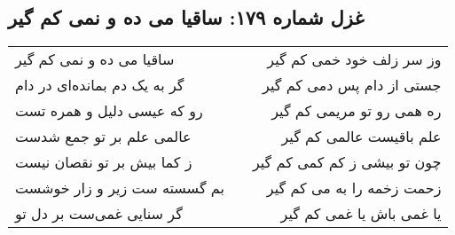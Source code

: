 \begin{center}
\section*{غزل شماره ۱۷۹: ساقیا می ده و نمی کم گیر}
\label{sec:179}
\begin{longtable}{l p{0.5cm} r}
ساقیا می ده و نمی کم گیر
&&
وز سر زلف خود خمی کم گیر
\\
گر به یک دم بمانده‌ای در دام
&&
جستی از دام پس دمی کم گیر
\\
رو که عیسی دلیل و همره تست
&&
ره همی رو تو مریمی کم گیر
\\
عالمی علم بر تو جمع شدست
&&
علم باقیست عالمی کم گیر
\\
ز کما بیش بر تو نقصان نیست
&&
چون تو بیشی ز کم کمی کم گیر
\\
بم گسسته ست زیر و زار خوشست
&&
زحمت زخمه را به می کم گیر
\\
گر سنایی غمی‌ست بر دل تو
&&
یا غمی باش یا غمی کم گیر
\\
\end{longtable}
\end{center}
